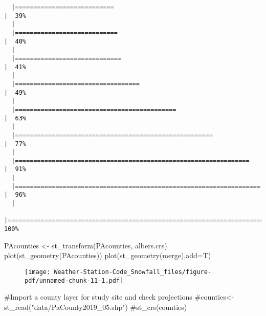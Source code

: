 \documentclass[
  letterpaper,
]{book}
\newenvironment{Shaded}{\begin{snugshade}}{\end{snugshade}}
\newcommand{\AttributeTok}[1]{\textcolor[rgb]{0.40,0.45,0.13}{#1}}
\newcommand{\CommentTok}[1]{\textcolor[rgb]{0.37,0.37,0.37}{#1}}
\newcommand{\FunctionTok}[1]{\textcolor[rgb]{0.28,0.35,0.67}{#1}}
\newcommand{\NormalTok}[1]{\textcolor[rgb]{0.00,0.23,0.31}{#1}}
\newcommand{\OtherTok}[1]{\textcolor[rgb]{0.00,0.23,0.31}{#1}}
\begin{document}
\begin{verbatim}
  |===========================                                           |  39%
  |                                                                            
  |============================                                          |  40%
  |                                                                            
  |=============================                                         |  41%
  |                                                                            
  |==================================                                    |  49%
  |                                                                            
  |============================================                          |  63%
  |                                                                            
  |======================================================                |  77%
  |                                                                            
  |================================================================      |  91%
  |                                                                            
  |===================================================================   |  96%
  |                                                                            
  |======================================================================| 100%
\end{verbatim}

\begin{Shaded}
\begin{Highlighting}[]
\NormalTok{PAcounties }\OtherTok{\textless{}{-}} \FunctionTok{st\_transform}\NormalTok{(PAcounties, albers.crs)}
\FunctionTok{plot}\NormalTok{(}\FunctionTok{st\_geometry}\NormalTok{(PAcounties))}
\FunctionTok{plot}\NormalTok{(}\FunctionTok{st\_geometry}\NormalTok{(merge),}\AttributeTok{add=}\NormalTok{T)}
\end{Highlighting}
\end{Shaded}

\begin{figure}[H]

{\centering \texttt{[image: Weather-Station-Code\_Snowfall\_files/figure-pdf/unnamed-chunk-11-1.pdf]}

}

\end{figure}

\begin{Shaded}
\begin{Highlighting}[]
\CommentTok{\#Import a county layer for study site and check projections}
\CommentTok{\#counties\textless{}{-}st\_read("data/PaCounty2019\_05.shp")}
\CommentTok{\#st\_crs(counties)}
\end{Highlighting}
\end{Shaded}
\end{document}
